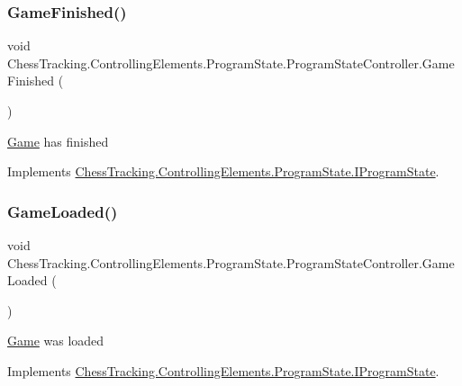 \subsubsection{\texorpdfstring{GameFinished()}{GameFinished()}}
{\footnotesize\ttfamily void Chess\+Tracking.\+Controlling\+Elements.\+Program\+State.\+Program\+State\+Controller.\+Game\+Finished (\begin{DoxyParamCaption}{ }\end{DoxyParamCaption})}



\mbox{\hyperlink{namespace_chess_tracking_1_1_game}{Game}} has finished 



Implements \mbox{\hyperlink{interface_chess_tracking_1_1_controlling_elements_1_1_program_state_1_1_i_program_state_a5c438d1bd53a0dd168eb56e20c482c1f}{Chess\+Tracking.\+Controlling\+Elements.\+Program\+State.\+I\+Program\+State}}.

\mbox{\label{class_chess_tracking_1_1_controlling_elements_1_1_program_state_1_1_program_state_controller_a48d65a925eb5a5f38a874e486a4477e2}} 
\subsubsection{\texorpdfstring{GameLoaded()}{GameLoaded()}}
{\footnotesize\ttfamily void Chess\+Tracking.\+Controlling\+Elements.\+Program\+State.\+Program\+State\+Controller.\+Game\+Loaded (\begin{DoxyParamCaption}{ }\end{DoxyParamCaption})}



\mbox{\hyperlink{namespace_chess_tracking_1_1_game}{Game}} was loaded 



Implements \mbox{\hyperlink{interface_chess_tracking_1_1_controlling_elements_1_1_program_state_1_1_i_program_state_afaaa62756391f219e5318342f9bb568a}{Chess\+Tracking.\+Controlling\+Elements.\+Program\+State.\+I\+Program\+State}}.


